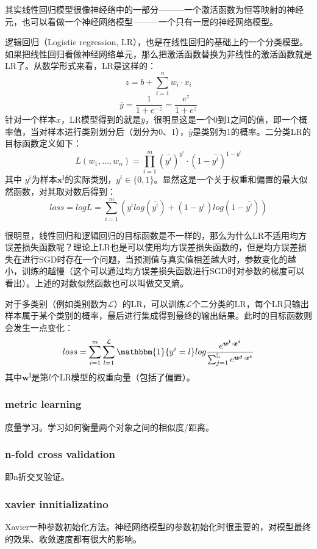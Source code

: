 其实线性回归模型很像神经络中的一部分———一个激活函数为恒等映射的神经元，也可以看做一个神经网络模型———一个只有一层的神经网络模型。

逻辑回归（Logistic regression, LR），也是在线性回归的基础上的一个分类模型。如果把线性回归看做神经网络单元，那么把激活函数替换为非线性的激活函数就是LR了。从数学形式来看，LR是这样的：
$$
z = b + \sum_{i=1}^{n} w_i \cdot x_i 
$$
$$
\bar{y} = \frac{1}{1 + e^{-z}} = \frac{e^z}{1 + e^z}
$$
针对一个样本$x$，LR模型得到的就是$\bar{y}$，很明显这是一个0到1之间的值，即一个概率值，当对样本进行类别划分后（划分为0、1），$\bar{y}$是类别为1的概率。二分类LR的目标函数定义如下：
$$
L(w_1,...,w_n) = \prod_{i = 1}^{m} (\bar{y^i} )^{y^i} \cdot ( 1 - \bar{y^i}) ^ {1 - y^i}
$$
其中 $y^i$为样本$\boldsymbol{x^i}$的实际类别，$y^i \in \{0, 1\}$。显然这是一个关于权重和偏置的最大似然函数，对其取对数后得到：
$$
loss = log L = \sum_{i=1}^{m} \left( y^i log (\bar{y^i}) + (1 - y^i) log ( 1 - \bar{y^i}) \right)
$$

很明显，线性回归和逻辑回归的目标函数是不一样的，那么为什么LR不适用均方误差损失函数呢？理论上LR也是可以使用均方误差损失函数的，但是均方误差损失在进行SGD时存在一个问题，当预测值与真实值相差越大时，参数变化的越小，训练的越慢（{\color{red}这个可以通过均方误差损失函数进行SGD时对参数的梯度可以看出}）。上述的对数似然函数也可以叫做交叉熵。

对于多类别（例如类别数为$\mathcal{L}$）的LR，可以训练$\mathcal{L}$个二分类的LR，每个LR只输出样本属于某个类别的概率，最后进行集成得到最终的输出结果。此时的目标函数则会发生一点变化：
$$
loss = \sum_{i=1}^{m} \sum_{l=1}^{\mathcal{L}} \mathbbm{1}\{y^i = l\} log \frac{e^{ \boldsymbol{w^l} \cdot \boldsymbol{x^i} } }{ \sum_{j=1}^{\mathbb{L}} e^{ \boldsymbol{w^j} \cdot \boldsymbol{x^i}} }
$$
其中$\boldsymbol{w^l}$是第$l$个LR模型的权重向量（包括了偏置）。

\subsubsection{metric learning} 
度量学习。学习如何衡量两个对象之间的相似度/距离。


\subsubsection{n-fold cross validation}
即n折交叉验证。

\subsubsection{xavier innitializatino} 
Xavier\cite{pmlr-v9-glorot10a}一种参数初始化方法。神经网络模型的参数初始化时很重要的，对模型最终的效果、收敛速度都有很大的影响。

